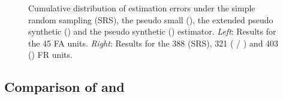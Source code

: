 \begin{figure}[H]
	\centering
	\caption{Cumulative distribution of estimation errors under the simple random sampling (SRS), the pseudo small (\psmall{}), the extended pseudo synthetic (\extpsynth{}) and the pseudo synthetic (\psynth{}) estimator. \textit{Left}: Results for the 45 FA units. \textit{Right}: Results for the 388 (SRS), 321 (\psmall{} / \extpsynth{}) and 403 (\psynth{}) FR units.}
	\label{fig:disterrors}
\end{figure}


\newpage
\subsection{Comparison of \psmall{} and \extpsynth{}}
\label{sec:comp}

